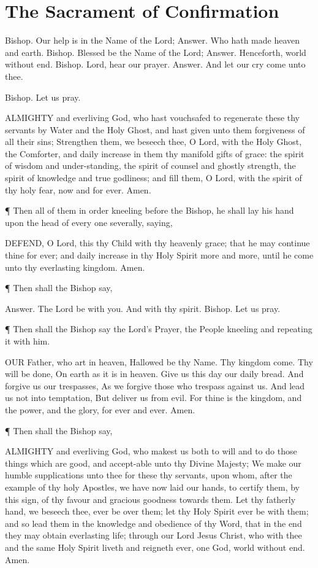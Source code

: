 \section{The Sacrament of Confirmation}

    Bishop. Our help is in the Name of the Lord;
    Answer. Who hath made heaven and earth.
    Bishop. Blessed be the Name of the Lord;
    Answer. Henceforth, world without end.
    Bishop. Lord, hear our prayer.
    Answer. And let our cry come unto thee.

Bishop. Let us pray.

ALMIGHTY and everliving God, who hast vouchsafed to regenerate these thy servants by Water and the Holy Ghost, and hast given unto them forgiveness of all their sins; Strengthen them, we beseech thee, O Lord, with the Holy Ghost, the Comforter, and daily increase in them thy manifold gifts of grace: the spirit of wisdom and under-standing, the spirit of counsel and ghostly strength, the spirit of knowledge and true godliness; and fill them, O Lord, with the spirit of thy holy fear, now and for ever. Amen. 
 

 
¶ Then all of them in order kneeling before the Bishop, he shall lay his hand upon the head of every one severally, saying,

DEFEND, O Lord, this thy Child with thy heavenly grace; that he may continue thine for ever; and daily increase in thy Holy Spirit more and more, until he come unto thy everlasting kingdom. Amen.

¶ Then shall the Bishop say,

Answer. 
The Lord be with you. 
And with thy spirit.
Bishop. Let us pray.

¶ Then shall the Bishop say the Lord's Prayer, the People kneeling and repeating it with him.

OUR Father, who art in heaven, Hallowed be thy Name. Thy kingdom come. Thy will be done, On earth as it is in heaven. Give us this day our daily bread. And forgive us our trespasses, As we forgive those who trespass against us. And lead us not into temptation, But deliver us from evil. For thine is the kingdom, and the power, and the glory, for ever and ever. Amen.

¶ Then shall the Bishop say,

ALMIGHTY and everliving God, who makest us both to will and to do those things which are good, and accept-able unto thy Divine Majesty; We make our humble supplications unto thee for these thy servants, upon whom, after the example of thy holy Apostles, we have now laid our hands, to certify them, by this sign, of thy favour and gracious goodness towards them. Let thy fatherly hand, we beseech thee, ever be over them; let thy Holy Spirit ever be with them; and so lead them in the knowledge and obedience of thy Word, that in the end they may obtain everlasting life; through our Lord Jesus Christ, who with thee and the same Holy Spirit liveth and reigneth ever, one God, world without end. Amen.

